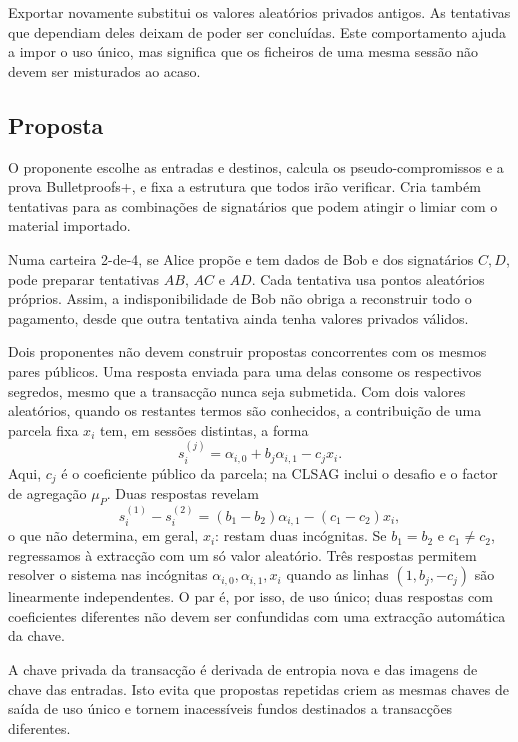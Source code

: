 Exportar novamente substitui os valores aleatórios privados antigos. As
tentativas que dependiam deles deixam de poder ser concluídas. Este
comportamento ajuda a impor o uso único, mas significa que os ficheiros de uma
mesma sessão não devem ser misturados ao acaso.

\subsection{Proposta}

%
O proponente escolhe as entradas e destinos, calcula os pseudo-compromissos e
a prova Bulletproofs+, e fixa a estrutura que todos irão verificar. Cria também
tentativas para as combinações de signatários que podem atingir o limiar com
o material importado.

Numa carteira 2-de-4, se Alice propõe e tem dados de Bob e dos signatários \(C,D\), pode
preparar tentativas \(AB\), \(AC\) e \(AD\). Cada tentativa usa pontos
aleatórios próprios. Assim, a indisponibilidade de Bob não obriga a reconstruir
todo o pagamento, desde que outra tentativa ainda tenha valores privados
válidos.

Dois proponentes não devem construir propostas concorrentes com os mesmos
pares públicos. Uma resposta enviada para uma delas consome os respectivos
segredos, mesmo que a transacção nunca seja submetida. Com dois valores
aleatórios, quando os restantes termos são conhecidos, a contribuição de
uma parcela fixa \(x_i\) tem, em sessões distintas, a forma
\[
 s_i^{(j)}=\alpha_{i,0}+b_j\alpha_{i,1}-c_jx_i.
\]
Aqui, \(c_j\) é o coeficiente público da parcela; na CLSAG inclui o desafio
e o factor de agregação \(\mu_P\).
Duas respostas revelam
\[
 s_i^{(1)}-s_i^{(2)}
 =(b_1-b_2)\alpha_{i,1}-(c_1-c_2)x_i,
\]
o que não determina, em geral, \(x_i\): restam duas incógnitas. Se
\(b_1=b_2\) e \(c_1\ne c_2\), regressamos à extracção com um só valor
aleatório. Três respostas permitem resolver o sistema nas incógnitas
\(\alpha_{i,0},\alpha_{i,1},x_i\) quando as linhas \((1,b_j,-c_j)\) são
linearmente independentes. O par é, por isso, de uso único; duas respostas
com coeficientes diferentes não devem ser confundidas com uma extracção
automática da chave.

A chave privada da transacção é derivada de entropia nova e das imagens de
chave das entradas. Isto evita que propostas repetidas criem as mesmas chaves
de saída de uso único e tornem inacessíveis fundos destinados a transacções
diferentes.


